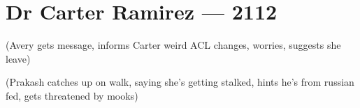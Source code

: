 \hypertarget{dr-carter-ramirez-2112}{%
\chapter*{Dr Carter Ramirez — 2112}\label{dr-carter-ramirez-2112}}

(Avery gets message, informs Carter weird ACL changes, worries, suggests she leave)

(Prakash catches up on walk, saying she's getting stalked, hints he's from russian fed, gets threatened by mooks)
